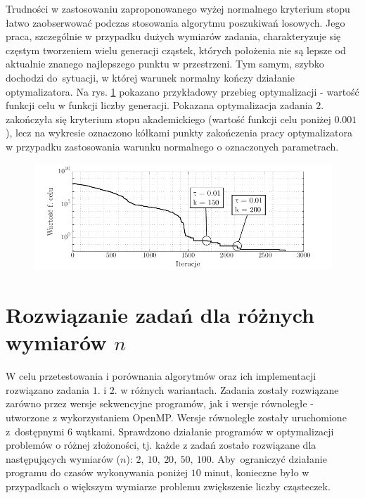 \documentclass[11pt, a4paper, oneside]{article}
\begin{document}
Trudności w zastosowaniu zaproponowanego wyżej normalnego kryterium stopu łatwo zaobserwować podczas stosowania algorytmu poszukiwań losowych. Jego praca, szczególnie w przypadku dużych wymiarów zadania, charakteryzuje się częstym tworzeniem wielu generacji cząstek, których położenia nie są lepsze od aktualnie znanego najlepszego punktu w przestrzeni. Tym samym, szybko dochodzi do~sytuacji, w której warunek normalny kończy działanie optymalizatora. Na rys. \ref{fig:warunek:mc} pokazano przykładowy przebieg optymalizacji - wartość funkcji celu w funkcji liczby generacji. Pokazana optymalizacja zadania $2$. zakończyła się kryterium stopu akademickiego (wartość funkcji celu poniżej $0.001$), lecz na wykresie oznaczono kółkami punkty zakończenia pracy optymalizatora w przypadku zastosowania warunku normalnego o oznaczonych parametrach.

\begin{figure}[h]
\centerline{\includegraphics[width=\dimexpr.9\textwidth-1em]{grafiki/warunek_stopu.pdf}}
\label{fig:warunek:mc}
\end{figure}

\section{Rozwiązanie zadań dla różnych wymiarów $n$}

W celu przetestowania i porównania algorytmów oraz ich implementacji rozwiązano zadania $1$. i $2$. w różnych wariantach. Zadania zostały rozwiązane zarówno przez wersje sekwencyjne programów, jak i wersje równoległe - utworzone z wykorzystaniem OpenMP. Wersje równoległe zostały uruchomione z~dostępnymi $6$ wątkami. Sprawdzono działanie programów w optymalizacji problemów o różnej złożoności, tj. każde z zadań zostało rozwiązane dla następujących wymiarów ($n$): $2, \ 10, \ 20, \ 50, \ 100$. Aby~ograniczyć działanie programu do czasów wykonywania poniżej $10$ minut, konieczne było w przypadkach o większym wymiarze problemu zwiększenie liczby cząsteczek.
\end{document}
